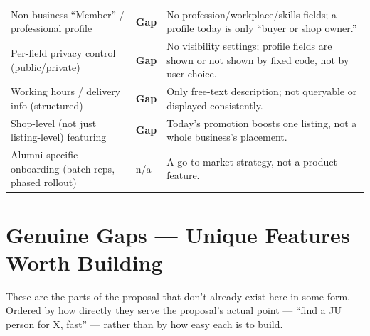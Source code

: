 \documentclass[11pt]{article}
\newcommand{\statusgap}{\textcolor{gap}{\textbf{Gap}}}
\begin{document}
\begin{longtable}{@{}p{5.6cm}p{1.7cm}p{7.6cm}@{}}
Non-business ``Member'' / professional profile & \statusgap & No profession/workplace/skills fields; a profile today is only ``buyer or shop owner.'' \\
Per-field privacy control (public/private) & \statusgap & No visibility settings; profile fields are shown or not shown by fixed code, not by user choice. \\
Working hours / delivery info (structured) & \statusgap & Only free-text description; not queryable or displayed consistently. \\
Shop-level (not just listing-level) featuring & \statusgap & Today's promotion boosts one listing, not a whole business's placement. \\
Alumni-specific onboarding (batch reps, phased rollout) & n/a & A go-to-market strategy, not a product feature. \\
\bottomrule
\end{longtable}

\section{Genuine Gaps --- Unique Features Worth Building}
\label{sec:gaps}

These are the parts of the proposal that don't already exist here in some form. Ordered by how directly they serve the proposal's actual point --- ``find a JU person for X, fast'' --- rather than by how easy each is to build.
\end{document}
